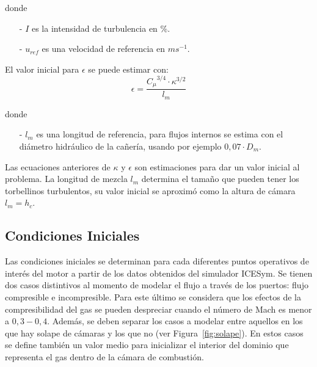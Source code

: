 
donde
\begin{itemize}
  \item[-] $I$ es la intensidad de turbulencia en \%.
  \item[-] $u_{ref}$ es una velocidad de referencia en $ms^{-1}$.
\end{itemize}

El valor inicial para $\epsilon$ se puede estimar con:
\begin{equation}\label{eq:epsilon_est}
  \epsilon = \frac{{C_{\mu}}^{3/4} \cdot {\kappa}^{3/2}} {l_{m}}
\end{equation}

donde
\begin{itemize}
 \item[-] $l_{m}$ es una longitud de referencia, para flujos internos se estima
con el diámetro hidráulico de la cañería, usando por ejemplo $0,07 \cdot D_{m}$.
\end{itemize}



Las ecuaciones anteriores de  $\kappa$ y $\epsilon$ son estimaciones para dar un
valor inicial al problema.
%
La longitud de mezcla $l_m$ determina el tamaño que pueden tener los torbellinos
turbulentos, su valor inicial se aproximó como la altura de cámara $l_m = h_c$.
%

\subsection{Condiciones Iniciales}\label{cap2:cond_iniciales}
%
Las condiciones iniciales se determinan para cada diferentes puntos operativos
de interés del motor a partir de los datos obtenidos del simulador ICESym.
%
Se tienen dos casos distintivos al momento de modelar el flujo a través de los
puertos: flujo compresible e incompresible.
%
Para este último se considera que los efectos de la compresibilidad del gas se
pueden despreciar cuando el número de Mach es menor a $0,3-0,4$.
%
Además, se deben separar los casos a modelar entre aquellos en los que hay
solape de cámaras y los que no (ver Figura~\ref{fig:solape}).
%
En estos casos se define también un valor medio para inicializar el interior del
dominio que representa el gas dentro de la cámara de combustión.


